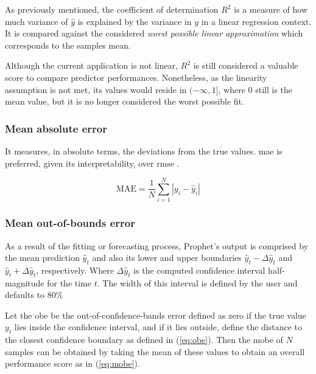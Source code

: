 As previously mentioned, the coefficient of determination $R^2$ is a measure of how much variance of $\hat{y}$ is explained by the variance in $y$ in a linear regression context. It is compared against the considered \emph{worst possible linear approximation} which corresponds to the samples mean.

Although the current application is not linear, $R^2$ is still considered a valuable score to compare predictor performances. Nonetheless, as the linearity assumption is not met, its values would reside in $(-\infty, 1]$, where 0 still is the mean value, but it is no longer considered the worst possible fit.



\subsubsection*{Mean absolute error}

It measures, in absolute terms, the deviations from the true values. \ac{mae} is preferred, given its interpretability, over \ac{rmse} \cite{MAE}.

\begin{equation}\label{eq:mae}
	\text{MAE}	= \frac{1}{N} \sum_{i=1}^{N}{ \left| y_i - \hat{y}_i \right| }
\end{equation}


\subsubsection*{Mean out-of-bounds error}

As a result of the fitting or forecasting process, Prophet's output is comprised by the mean prediction $\hat{y}_t$ and also its lower and upper boundaries $\hat{y}_t - \Delta\hat{y}_t$ and $\hat{y}_t + \Delta\hat{y}_t$, respectively. Where $\Delta \hat{y}_t$ is the computed confidence interval half-magnitude for the time $t$. The width of this interval is defined by the user and defaults to $80\%$ 

Let  the \ac{obe} be the out-of-confidence-bands error defined as zero if the true value $y_t$ lies inside the confidence interval, and if it lies outside, define the distance to the closest confidence boundary as defined in (\ref{eq:obe}). Then the \ac{mobe} of $N$ samples can be obtained by taking the mean of these values to obtain an overall performance score as in (\ref{eq:mobe}). 

